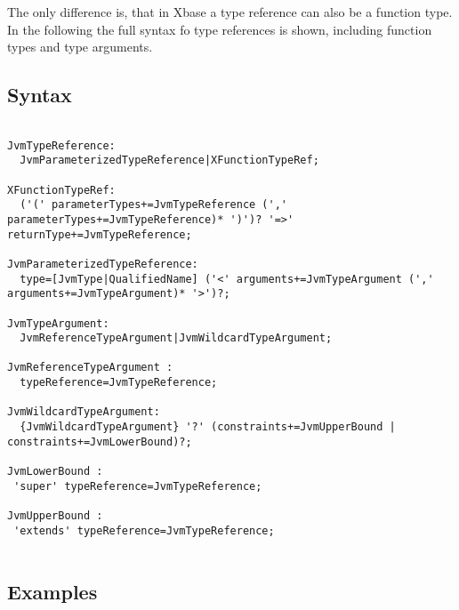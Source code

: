 \documentclass[a4paper,10pt]{scrreprt}
\begin{document}
The only difference is, that in Xbase a type reference can also be a function type. In the following the full syntax fo type references is shown, including function types and
type arguments.

\subsection{ Syntax }


\begin{lstlisting}

JvmTypeReference:
  JvmParameterizedTypeReference|XFunctionTypeRef;
	
XFunctionTypeRef:
  ('(' parameterTypes+=JvmTypeReference (',' parameterTypes+=JvmTypeReference)* ')')? '=>' returnType+=JvmTypeReference;

JvmParameterizedTypeReference:
  type=[JvmType|QualifiedName] ('<' arguments+=JvmTypeArgument (',' arguments+=JvmTypeArgument)* '>')?;

JvmTypeArgument:
  JvmReferenceTypeArgument|JvmWildcardTypeArgument;
  
JvmReferenceTypeArgument :
  typeReference=JvmTypeReference;

JvmWildcardTypeArgument:
  {JvmWildcardTypeArgument} '?' (constraints+=JvmUpperBound | constraints+=JvmLowerBound)?;

JvmLowerBound :
 'super' typeReference=JvmTypeReference;

JvmUpperBound : 
 'extends' typeReference=JvmTypeReference;


\end{lstlisting}





\subsection{ Examples }
\end{document}
